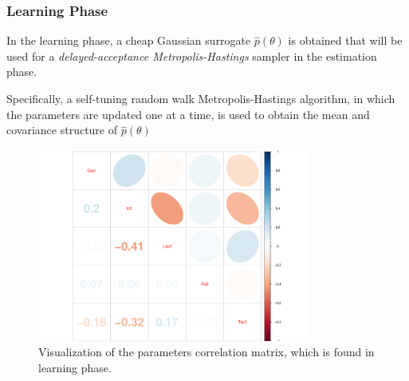 \documentclass{beamer}
\begin{document}

\begin{frame}
\frametitle{Learning Phase}

In the learning phase, a cheap Gaussian surrogate $\hat{p}(\theta)$ is obtained that will be used for a \textit{delayed-acceptance Metropolis-Hastings} sampler in the estimation phase. 

Specifically, a self-tuning random walk Metropolis-Hastings algorithm, in which the parameters are updated one at a time, is used to obtain the mean and covariance structure of $\hat{p}(\theta)$  

\end{frame}


\begin{frame}
\begin{figure}[h]
	\centering
	\includegraphics[width=0.8\textwidth]{../Chapters/05MCMCOU/plots/realdatalearningcorMatrix.pdf}
	\caption{Visualization of the parameters correlation matrix, which is found in learning phase. }\label{realdatacorMatrix}
\end{figure}

\end{frame}

\end{document}
